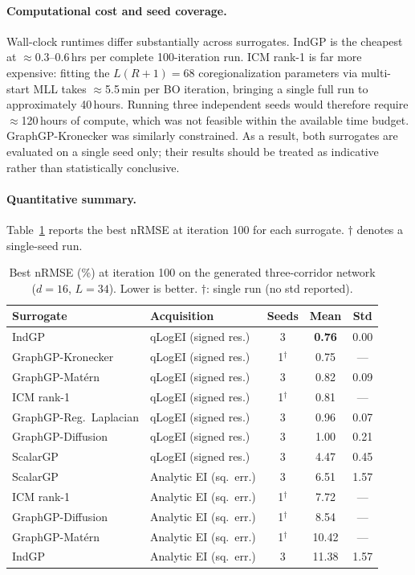 \documentclass[11pt]{article}
\begin{document}
\paragraph{Computational cost and seed coverage.}
Wall-clock runtimes differ substantially across surrogates.
IndGP is the cheapest at $\approx$0.3--0.6\,hrs per complete 100-iteration run.
ICM rank-1 is far more expensive: fitting the $L(R+1)=68$ coregionalization
parameters via multi-start MLL takes $\approx$5.5\,min per BO iteration,
bringing a single full run to approximately 40\,hours.
Running three independent seeds would therefore require $\approx$120\,hours
of compute, which was not feasible within the available time budget.
GraphGP-Kronecker was similarly constrained. As a result, both surrogates
are evaluated on a single seed only; their results should be treated as
indicative rather than statistically conclusive.

\paragraph{Quantitative summary.}
Table~\ref{tab:results-summary} reports the best nRMSE at iteration 100
for each surrogate. $\dagger$ denotes a single-seed run.

\begin{table}[h]
\centering
\caption{Best nRMSE (\%) at iteration 100 on the generated three-corridor network
($d=16$, $L=34$). Lower is better. $\dagger$: single run (no std reported).}
\label{tab:results-summary}
\begin{tabular}{llccc}
\toprule
\textbf{Surrogate} & \textbf{Acquisition} & \textbf{Seeds} & \textbf{Mean} & \textbf{Std} \\
\midrule
IndGP                   & qLogEI (signed res.) & 3 & \textbf{0.76} & 0.00 \\
GraphGP-Kronecker       & qLogEI (signed res.) & 1$^\dagger$ & 0.75 & --- \\
GraphGP-Mat\'ern        & qLogEI (signed res.) & 3 & 0.82 & 0.09 \\
ICM rank-1              & qLogEI (signed res.) & 1$^\dagger$ & 0.81 & --- \\
GraphGP-Reg.\ Laplacian & qLogEI (signed res.) & 3 & 0.96 & 0.07 \\
GraphGP-Diffusion       & qLogEI (signed res.) & 3 & 1.00 & 0.21 \\
ScalarGP                & qLogEI (signed res.) & 3 & 4.47 & 0.45 \\
\midrule
ScalarGP                & Analytic EI (sq.\ err.) & 3 & 6.51 & 1.57 \\
ICM rank-1              & Analytic EI (sq.\ err.) & 1$^\dagger$ & 7.72 & --- \\
GraphGP-Diffusion       & Analytic EI (sq.\ err.) & 1$^\dagger$ & 8.54 & --- \\
GraphGP-Mat\'ern        & Analytic EI (sq.\ err.) & 1$^\dagger$ & 10.42 & --- \\
IndGP                   & Analytic EI (sq.\ err.) & 3 & 11.38 & 1.57 \\
\bottomrule
\end{tabular}
\end{table}
\end{document}
